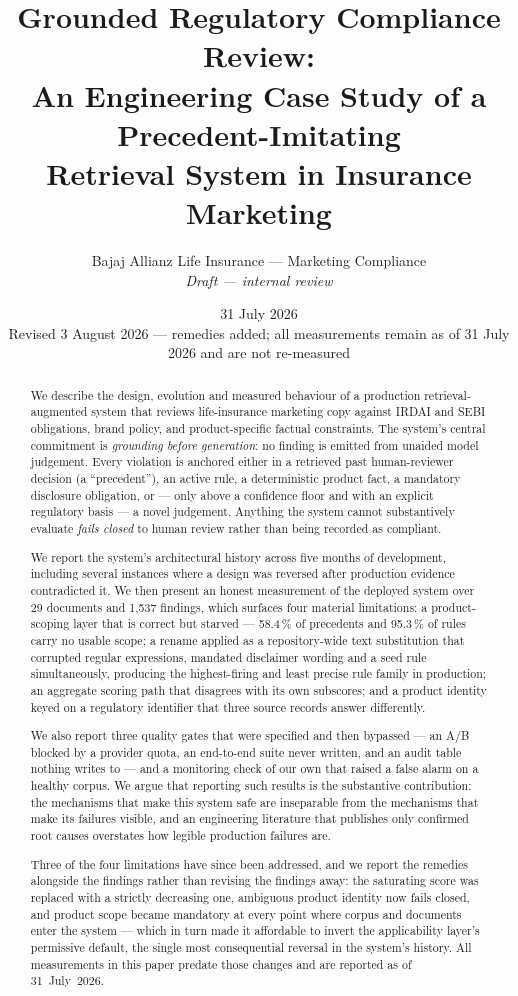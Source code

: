 \documentclass[10pt]{article}
\title{\textbf{Grounded Regulatory Compliance Review:\\
An Engineering Case Study of a Precedent-Imitating\\
Retrieval System in Insurance Marketing}}
\author{%
  Bajaj Allianz Life Insurance --- Marketing Compliance\\
  \small \textit{Draft --- internal review}
}
\date{31 July 2026\\[2pt]
  \small Revised 3 August 2026 --- remedies added; all measurements remain
  as of 31 July 2026 and are not re-measured}
\begin{document}
\maketitle

\begin{abstract}
We describe the design, evolution and measured behaviour of a production
retrieval-augmented system that reviews life-insurance marketing copy against
IRDAI and SEBI obligations, brand policy, and product-specific factual
constraints. The system's central commitment is \emph{grounding before
generation}: no finding is emitted from unaided model judgement. Every
violation is anchored either in a retrieved past human-reviewer decision (a
``precedent''), an active rule, a deterministic product fact, a mandatory
disclosure obligation, or --- only above a confidence floor and with an
explicit regulatory basis --- a novel judgement. Anything the system cannot
substantively evaluate \emph{fails closed} to human review rather than being
recorded as compliant.

We report the system's architectural history across five months of
development, including several instances where a design was reversed after
production evidence contradicted it. We then present an honest measurement of
the deployed system over 29 documents and 1{,}537 findings, which surfaces four
material limitations: a product-scoping layer that is correct but starved ---
58.4\,\% of precedents and 95.3\,\% of rules carry no usable scope; a rename
applied as a repository-wide text substitution that corrupted regular
expressions, mandated disclaimer wording and a seed rule simultaneously,
producing the highest-firing and least precise rule family in production; an
aggregate scoring path that disagrees with its own subscores; and a product
identity keyed on a regulatory identifier that three source records answer
differently.

We also report three quality gates that were specified and then bypassed --- an
A/B blocked by a provider quota, an end-to-end suite never written, and an
audit table nothing writes to --- and a monitoring check of our own that raised
a false alarm on a healthy corpus. We argue that reporting such results is the
substantive contribution: the mechanisms that make this system safe are
inseparable from the mechanisms that make its failures visible, and an
engineering literature that publishes only confirmed root causes overstates how
legible production failures are.

Three of the four limitations have since been addressed, and we report the
remedies alongside the findings rather than revising the findings away: the
saturating score was replaced with a strictly decreasing one, ambiguous product
identity now fails closed, and product scope became mandatory at every point
where corpus and documents enter the system --- which in turn made it affordable
to invert the applicability layer's permissive default, the single most
consequential reversal in the system's history. All measurements in this paper
predate those changes and are reported as of 31~July~2026.
\end{abstract}
\end{document}
